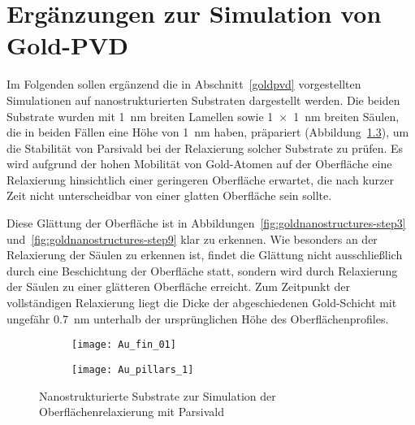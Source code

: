 \chapter{Ergänzungen zur Simulation von Gold-PVD}

Im Folgenden sollen ergänzend die in Abschnitt~\ref{goldpvd} vorgestellten Simulationen auf nanostrukturierten Substraten dargestellt werden.
Die beiden Substrate wurden mit \SI{1}{\nano\meter} breiten Lamellen sowie \SI{1x1}{\nano\meter} breiten Säulen, die in beiden Fällen eine Höhe von \SI{1}{\nano\meter} haben, präpariert (Abbildung~\ref{fig:goldnanostructures}), um die Stabilität von Parsivald bei der Relaxierung solcher Substrate zu prüfen.
Es wird aufgrund der hohen Mobilität von Gold-Atomen auf der Oberfläche eine Relaxierung hinsichtlich einer geringeren Oberfläche erwartet, die nach kurzer Zeit nicht unterscheidbar von einer glatten Oberfläche sein sollte.

Diese Glättung der Oberfläche ist in Abbildungen~\ref{fig:goldnanostructures-step3} und~\ref{fig:goldnanostructures-step9} klar zu erkennen.
Wie besonders an der Relaxierung der Säulen zu erkennen ist, findet die Glättung nicht ausschließlich durch eine Beschichtung der Oberfläche statt, sondern wird durch Relaxierung der Säulen zu einer glätteren Oberfläche erreicht.
Zum Zeitpunkt der vollständigen Relaxierung liegt die Dicke der abgeschiedenen Gold-Schicht mit ungefähr \SI{0.7}{\nano\meter} unterhalb der ursprünglichen Höhe des Oberflächenprofiles.

\vspace{3em}

\begin{figure}[H]
  \captionsetup[subfigure]{singlelinecheck=false}
  \def\subfigwidth{0.49\textwidth}

  \begin{subfigure}[t]{\subfigwidth}
    \texttt{[image: Au\_fin\_01]}
    \label{fig:goldnanostructures-fins}
  \end{subfigure}
  \hfill
  \begin{subfigure}[t]{\subfigwidth}
    \texttt{[image: Au\_pillars\_1]}
    \label{fig:goldnanostructures-columns}
  \end{subfigure}

  \caption{Nanostrukturierte Substrate zur Simulation der Oberflächenrelaxierung mit Parsivald}
  \label{fig:goldnanostructures}

\end{figure}

